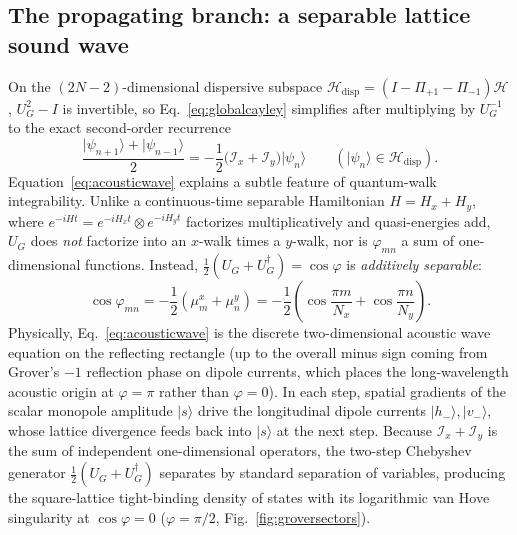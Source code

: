 \documentclass[11pt,a4paper,oneside]{report}
\newcommand{\ket}[1]{\lvert #1\rangle}
\newcommand{\HH}{\mathcal H}
\newcommand{\Id}{I}
\numberwithin{equation}{chapter}
\begin{document}
\subsection{The propagating branch: a separable lattice sound wave}

On the \((2N-2)\)-dimensional dispersive subspace
\(\HH_{\mathrm{disp}}=(\Id-\Pi_{+1}-\Pi_{-1})\HH\), \(U_G^2-\Id\) is
invertible, so Eq.~\eqref{eq:globalcayley} simplifies after multiplying by
\(U_G^{-1}\) to the exact second-order recurrence
\begin{equation}
\boxed{
\frac{\ket{\psi_{n+1}}+\ket{\psi_{n-1}}}{2}
=-\frac12\big(\mathcal I_x+\mathcal I_y\big)\ket{\psi_n}
\qquad(\ket{\psi_n}\in\HH_{\mathrm{disp}}).
}
\label{eq:acousticwave}
\end{equation}
Equation~\eqref{eq:acousticwave} explains a subtle feature of quantum-walk
integrability. Unlike a continuous-time separable Hamiltonian
\(H=H_x+H_y\), where \(e^{-iHt}=e^{-iH_xt}\otimes e^{-iH_yt}\) factorizes
multiplicatively and quasi-energies add, \(U_G\) does \emph{not} factorize
into an \(x\)-walk times a \(y\)-walk, nor is \(\varphi_{mn}\) a sum of
one-dimensional functions. Instead, \(\tfrac12(U_G+U_G^\dagger)=\cos\varphi\)
is \emph{additively separable}:
\begin{equation}
\cos\varphi_{mn}=-\frac12(\mu_m^x+\mu_n^y)
=-\frac12\left(\cos\frac{\pi m}{N_x}+\cos\frac{\pi n}{N_y}\right).
\end{equation}
Physically, Eq.~\eqref{eq:acousticwave} is the discrete two-dimensional
acoustic wave equation on the reflecting rectangle (up to the overall minus
sign coming from Grover's \(-1\) reflection phase on dipole currents, which
places the long-wavelength acoustic origin at \(\varphi=\pi\) rather than
\(\varphi=0\)). In each step, spatial gradients of the scalar monopole
amplitude \(\ket s\) drive the longitudinal dipole currents
\(\ket{h_-},\ket{v_-}\), whose lattice divergence feeds back into \(\ket s\)
at the next step. Because \(\mathcal I_x+\mathcal I_y\) is the sum of
independent one-dimensional operators, the two-step Chebyshev generator
\(\tfrac12(U_G+U_G^\dagger)\) separates by standard separation of variables,
producing the square-lattice tight-binding density of states with its
logarithmic van Hove singularity at \(\cos\varphi=0\) (\(\varphi=\pi/2\),
Fig.~\ref{fig:groversectors}).
\end{document}
